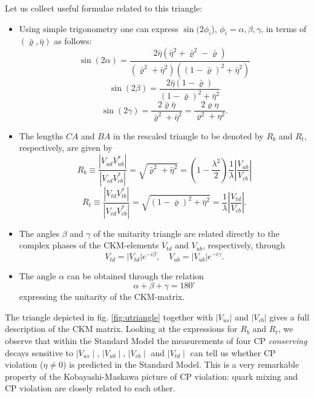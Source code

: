 \documentclass[12pt,rotate]{article}
\newcommand{\vcb}{|V_{cb}|}
\newcommand{\beq}{\begin{equation}}
\newcommand{\eeq}{\end{equation}}
\newcommand{\bi}{\begin{itemize}}
\newcommand{\ei}{\end{itemize}}
\begin{document}
\begin{itemize}
Let us collect useful formulae related to this triangle:
\bi
\item
Using simple trigonometry one can express $\sin(2\phi_i$), $\phi_i=
\alpha, \beta, \gamma$, in terms of $(\bar\varrho,\bar\eta)$ as follows:
\begin{equation}\label{2.89}
\sin(2\alpha)=\frac{2\bar\eta(\bar\eta^2+\bar\varrho^2-\bar\varrho)}
  {(\bar\varrho^2+\bar\eta^2)((1-\bar\varrho)^2
  +\bar\eta^2)}  
\end{equation}
\begin{equation}\label{2.90}
\sin(2\beta)=\frac{2\bar\eta(1-\bar\varrho)}{(1-\bar\varrho)^2 + \bar\eta^2}
\end{equation}
 \begin{equation}\label{2.91}
\sin(2\gamma)=\frac{2\bar\varrho\bar\eta}{\bar\varrho^2+\bar\eta^2}=
\frac{2\varrho\eta}{\varrho^2+\eta^2}.
\end{equation}
\item
The lengths $CA$ and $BA$ in the
rescaled triangle  to be denoted by $R_b$ and $R_t$,
respectively, are given by
%
\begin{equation}\label{2.94}
R_b \equiv \frac{| V_{ud}^{}V^*_{ub}|}{| V_{cd}^{}V^*_{cb}|}
= \sqrt{\bar\varrho^2 +\bar\eta^2}
= (1-\frac{\lambda^2}{2})\frac{1}{\lambda}
\left| \frac{V_{ub}}{V_{cb}} \right|
\end{equation}
\begin{equation}\label{2.95}
R_t \equiv \frac{| V_{td}^{}V^*_{tb}|}{| V_{cd}^{}V^*_{cb}|} =
 \sqrt{(1-\bar\varrho)^2 +\bar\eta^2}
=\frac{1}{\lambda} \left| \frac{V_{td}}{V_{cb}} \right|.
\end{equation}
\item
The angles $\beta$ and $\gamma$ of the unitarity triangle are related
directly to the complex phases of the CKM-elements $V_{td}$ and
$V_{ub}$, respectively, through
\beq\label{e417}
V_{td}=|V_{td}|e^{-i\beta},\quad V_{ub}=|V_{ub}|e^{-i\gamma}.
\eeq
\item
The angle $\alpha$ can be obtained through the relation
\beq\label{e419}
\alpha+\beta+\gamma=180^\circ
\eeq
expressing the unitarity of the CKM-matrix.
\ei

The triangle depicted in fig. \ref{fig:utriangle} together with $|V_{us}|$ 
and $\vcb$ gives a full description of the CKM matrix. 
Looking at the expressions for $R_b$ and $R_t$, we observe that within
the Standard Model the measurements of four CP
{\it conserving } decays sensitive to $\mid V_{us}\mid$, $\mid V_{ub}\mid$,   
$\mid V_{cb}\mid $ and $\mid V_{td}\mid$ can tell us whether CP violation
($\eta \not= 0$) is predicted in the Standard Model. 
This is a very remarkable property of
the Kobayashi-Maskawa picture of CP violation: quark mixing and CP violation
are closely related to each other. 


\end{itemize}
\end{document}
